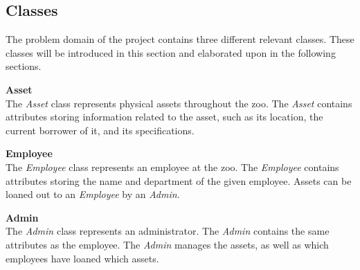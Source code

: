 \subsection{Classes}

The problem domain of the project contains three different relevant classes. These classes will be introduced in this section and elaborated upon in the following sections. 
\newline

\textbf{Asset}\\
The \textit{Asset} class represents physical assets throughout the zoo. The \textit{Asset} contains attributes storing information related to the asset, such as its location, the current borrower of it, and its specifications.
\newline



\textbf{Employee}\\
The \textit{Employee} class represents an employee at the zoo. The \textit{Employee} contains attributes storing the name and department of the given employee. Assets can be loaned out to an \textit{Employee} by an \textit{Admin}.
\newline

\textbf{Admin}\\
The \textit{Admin} class represents an administrator. The \textit{Admin} contains the same attributes as the employee. The \textit{Admin} manages the assets, as well as which employees have loaned which assets.

